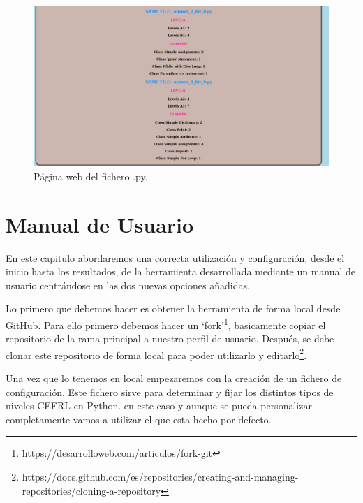 \documentclass[a4paper, 12pt]{book}
\begin{document}
\begin{figure}
  \centering
  \includegraphics[width=1\textwidth]{img/uso10.png}
  \caption{Página web del fichero .py.}\label{fig:uso10}
\end{figure}




\cleardoublepage
\chapter{Manual de Usuario}

En este capitulo abordaremos una correcta utilización y configuración, desde el inicio hasta los resultados, de la herramienta desarrollada mediante un manual de usuario centrándose en las dos nuevas opciones añadidas.

Lo primero que debemos hacer es obtener la herramienta de forma local desde GitHub. Para ello primero debemos hacer un `fork'\footnote{https://desarrolloweb.com/articulos/fork-git}, basicamente copiar el repositorio de la rama principal a nuestro perfil de usuario. Después, se debe clonar este repositorio de forma local para poder utilizarlo y editarlo\footnote{https://docs.github.com/es/repositories/creating-and-managing-repositories/cloning-a-repository}.

Una vez que lo tenemos en local empezaremos con la creación de un fichero de configuración. Este fichero sirve para determinar y fijar los distintos tipos de niveles CEFRL en Python. en este caso y aunque se pueda personalizar completamente vamos a utilizar el que esta hecho por defecto.
\end{document}
